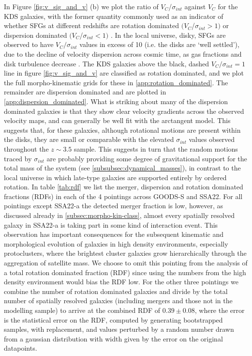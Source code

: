 \documentclass[fleqn,usenatbib]{mn2e}
\begin{document}
In Figure \ref{fig:v_sig_and_v} (b) we plot the ratio of $V_{C}$/$\sigma_{int}$ against $V_{C}$ for the KDS galaxies, with the former quantity commonly used as an indicator of whether SFGs at different redshifts are rotation dominated $(V_{C}$/$\sigma_{int} > 1)$ or dispersion dominated $(V_{C}$/$\sigma_{int} < 1)$ \citep[e.g.][]{ForsterSchreiber2009,Epinat2012,Wisnioski2015,Stott2016,Harrison2017}.
In the local universe, disky, SFGs are observed to have $V_{C}/\sigma_{int}$ values in excess of 10 (i.e. the disks are `well settled'), due to the decline of velocity dispersion across cosmic time, as gas fractions and disk turbulence decrease \citep[e.g.][]{Epinat2008,Epinat2008a}.
The KDS galaxies above the black, dashed $V_{C}/\sigma_{int} = 1$ line in figure \ref{fig:v_sig_and_v} are classified as rotation dominated, and we plot the full morpho-kinematic grids for these in \cref{app:rotation_dominated}.
The remainder are dispersion dominated and are plotted in \cref{app:dispersion_dominated}.
What is striking about many of the dispersion dominated galaxies is that they show clear velocity gradients across the observed velocity maps, and can generally be well fit with the arctangent model.
This suggests that, for these galaxies, although rotational motions are present within the disks, they are small or comparable with the elevated $\sigma_{int}$ values observed throughout the $z \sim 3.5$ sample.
This suggests in turn that the random motions traced by $\sigma_{int}$ are probably providing some degree of gravitational support for the total mass of the system (see \cref{subsubsec:dynamical_masses}), in contrast to the local universe in which late-type galaxies are supported entirely by ordered rotation.
In table \ref{tab:rdf} we list the merger, dispersion and rotation dominated fractions (RDFs) in each of the 4 pointings across GOODS-S and SSA22.
For all pointings except SSA22-a the detected merger fraction is low, however, as discussed already in \cref{subsec:morpho-kin-class}, almost every spatially resolved galaxy in SSA22-a is taking part in some kind of interaction event.
This observation has important consequences for the subsequent kinematic and morphological evolution of galaxies in high density environments, especially protoclusters, where the brightest cluster galaxies grow hierarchically through the aggregation of satellite mass.
We choose to omit this pointing from the analysis of a total rotation dominated fraction (RDF) since using the numbers from the high density environment would bias the RDF low.
For the other three pointings we combine the number of rotation dominated galaxies and divide by the total number of spatially resolved galaxies (including mergers and those not in the modelling sample) to arrive at the combined RDF of $0.39\pm 0.08$, where the error is the statistical error on the RDF, computed by generating bootstrapped samples, with replacement, and values perturbed by a random number drawn from a gaussian distribution with width given by the error on the original datapoints.
\end{document}
